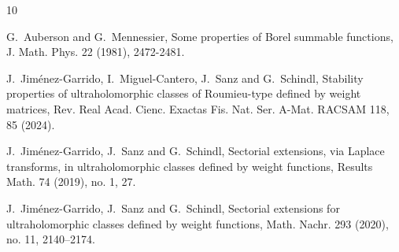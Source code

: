 \documentclass[11pt,a4paper]{article}
\theoremstyle{plain}
\theoremstyle{definition}
\begin{document}

\begin{thebibliography}{10}


%
%	
	
	G.~Auberson and G.~Mennessier, Some properties of {B}orel summable functions, J. Math. Phys. 22 (1981), 2472-2481.


	J.~Jim{\'e}nez-Garrido, I.~Miguel-Cantero, J.~Sanz and G.~Schindl, Stability properties of ultraholomorphic classes of {R}oumieu-type defined by weight matrices, Rev. Real Acad. Cienc. Exactas Fis. Nat. Ser. A-Mat. RACSAM 118, 85 (2024).
	
	
	J.~Jim{\'e}nez-Garrido, J.~Sanz and G.~Schindl, Sectorial extensions, via Laplace transforms, in ultraholomorphic
	classes defined by weight functions, Results Math. 74 (2019), no. 1, 27.
	
	J.~Jim{\'e}nez-Garrido, J.~Sanz and G.~Schindl, Sectorial extensions for ultraholomorphic classes defined by weight	 functions, Math. Nachr. 293 (2020), no. 11, 2140--2174.
	
	

\end{thebibliography}
\end{document}
